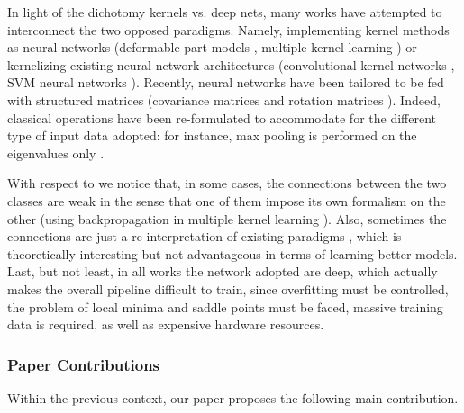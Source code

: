 \documentclass[10pt,twocolumn]{article}
\begin{document}
In light of the dichotomy kernels vs. deep nets, many works have attempted to interconnect the two opposed paradigms. Namely, implementing kernel methods as neural networks (\eg deformable part models \cite{Girshick:CVPR15}, multiple kernel learning \cite{Rebai:NCA16}) or kernelizing existing neural network architectures (\eg convolutional kernel networks \cite{Mairal:NIPS14}, SVM neural networks \cite{Tang13}). Recently, neural networks have been tailored to be fed with structured matrices (covariance matrices \cite{deepspd} and rotation matrices \cite{deeplie}). Indeed, classical operations have been re-formulated to accommodate for the different type of input data adopted: for instance, max pooling is performed on the eigenvalues only \cite{Tang13}. 

With respect to \cite{Girshick:CVPR15,Rebai:NCA16,Mairal:NIPS14,Tang13} we notice that, in some cases, the connections between the two classes are weak in the sense that one of them impose its own formalism on the other (\eg using backpropagation in multiple kernel learning \cite{Rebai:NCA16}). Also, sometimes the connections are just a re-interpretation of existing paradigms \cite{Girshick:CVPR15}, which is theoretically interesting but not advantageous in terms of learning better models. Last, but not least, in all works \cite{Du:CVPR15,Shahroudy:CVPR16,JCNN1,Liu:ECCV16,JCNN2,deepspd,deeplie} the network adopted are deep, which actually makes the overall pipeline difficult to train, since overfitting must be controlled, the problem of local minima and saddle points must be faced, massive training data is required, as well as expensive hardware resources.

\subsubsection*{Paper Contributions} Within the previous context, our paper proposes the following main contribution.
\end{document}
